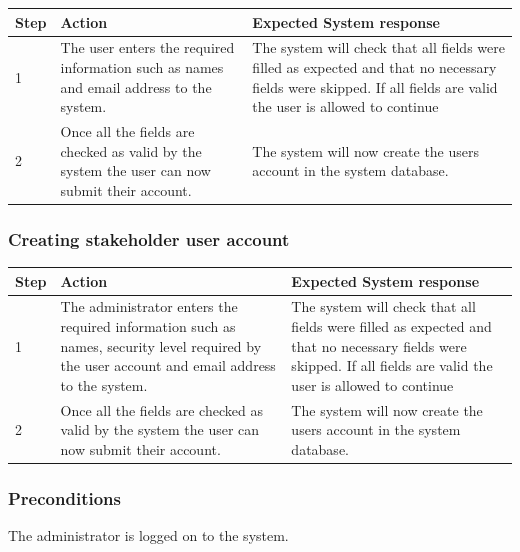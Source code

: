 \documentclass[12pt]{article}
\begin{document}
\begin{center}
\begin{tabular}{|l|p{6cm}|p{8cm}|}
\hline
Step & Action & Expected System response \\
\hline
1 & The user enters the required information such as names and email address to the system.  & The system will check that all fields were filled as expected and that no necessary fields were skipped. If all fields are valid the user is allowed to continue \\
\hline
2 & Once all the fields are checked as valid by the system the user can now submit their account. & The system will now create the users account in the system database. \\
\hline
\end{tabular}
\end{center}

\subsubsection{Creating stakeholder user account}

\begin{center}
\begin{tabular}{|l|p{6cm}|p{8cm}|}
\hline
Step & Action & Expected System response \\
\hline
1 & The administrator enters the required information such as names, security level required by the user account and email address to the system.  & The system will check that all fields were filled as expected and that no necessary fields were skipped. If all fields are valid the user is allowed to continue \\
\hline
2 & Once all the fields are checked as valid by the system the user can now submit their account. & The system will now create the users account in the system database. \\
\hline
\end{tabular}
\end{center}

\subsubsection*{Preconditions}
The administrator is logged on to the system.
\end{document}
